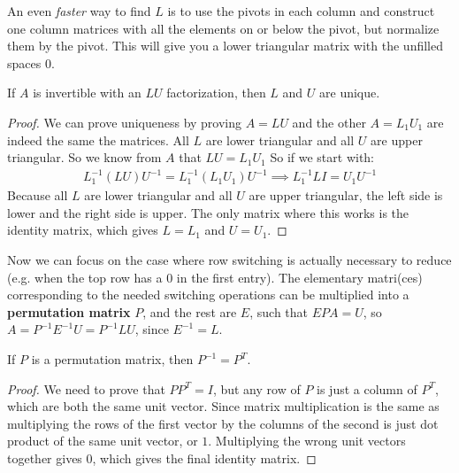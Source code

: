 \documentclass{article}
\begin{document}
An even \textit{faster} way to find $L$ is to use the pivots in each column and construct one column matrices with all the elements on or below the pivot, but normalize them by the pivot. This will give you a lower triangular matrix with the unfilled spaces $0$.

If $A$ is invertible with an $LU$ factorization, then $L$ and $U$ are unique.

\begin{proof}
We can prove uniqueness by proving $A = LU$ and the other $A = L_1U_1$ are indeed the same the matrices. All $L$ are lower triangular and all $U$ are upper triangular. So we know from $A$ that $LU = L_1U_1$ So if we start with:
\begin{gather*}
    L_1^{-1}(LU)U^{-1} = L_1^{-1}(L_1U_1)U^{-1} \implies L_1^{-1}L I = U_1U^{-1}
\end{gather*}
Because all $L$ are lower triangular and all $U$ are upper triangular, the left side is lower and the right side is upper. The only matrix where this works is the identity matrix, which gives $L = L_1$ and $U = U_1$.
\end{proof}
Now we can focus on the case where row switching is actually necessary to reduce (e.g. when the top row has a 0 in the first entry). The elementary matri(ces) corresponding to the needed switching operations can be multiplied into a \textbf{permutation matrix} $P$, and the rest are $E$, such that $EPA = U$, so $A = P^{-1}E^{-1}U = P^{-1}LU$, since $E^{-1} = L$.

If $P$ is a permutation matrix, then $P^{-1} = P^T$.
\begin{proof}
We need to prove that $PP^T = I$, but any row of $P$ is just a column of $P^T$, which are both the same unit vector. Since matrix multiplication is the same as multiplying the rows of the first vector by the columns of the second is just dot product of the same unit vector, or $1$. Multiplying the wrong unit vectors together gives $0$, which gives the final identity matrix.
\end{proof}
\end{document}
